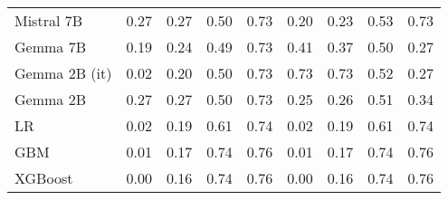 \begin{tabular}{lllllllll}
Mistral 7B & \cellcolor{orange!25.0} 0.27 & \cellcolor{orange!25.0} 0.27 & 0.50 & \cellcolor{cyan!25.0} 0.73 & 0.20 & \cellcolor{cyan!8.6} 0.23 & 0.53 & \cellcolor{cyan!23.4} 0.73 \\
Gemma 7B & 0.19 & 0.24 & 0.49 & \cellcolor{cyan!25.0} 0.73 & 0.41 & 0.37 & \cellcolor{orange!25.0} 0.50 & \cellcolor{orange!25.0} 0.27 \\
Gemma 2B (it) & \cellcolor{cyan!25.0} 0.02 & \cellcolor{cyan!25.0} 0.20 & 0.50 & \cellcolor{cyan!25.0} 0.73 & \cellcolor{orange!25.0} 0.73 & \cellcolor{orange!25.0} 0.73 & 0.52 & \cellcolor{orange!25.0} 0.27 \\
Gemma 2B & \cellcolor{orange!25.0} 0.27 & \cellcolor{orange!25.0} 0.27 & 0.50 & \cellcolor{cyan!25.0} 0.73 & 0.25 & 0.26 & 0.51 & 0.34 \\
LR & 0.02 & 0.19 & 0.61 & 0.74 & 0.02 & 0.19 & 0.61 & 0.74 \\
GBM & 0.01 & 0.17 & 0.74 & 0.76 & 0.01 & 0.17 & 0.74 & 0.76 \\
XGBoost & 0.00 & 0.16 & 0.74 & 0.76 & 0.00 & 0.16 & 0.74 & 0.76 \\
\bottomrule
\end{tabular}

